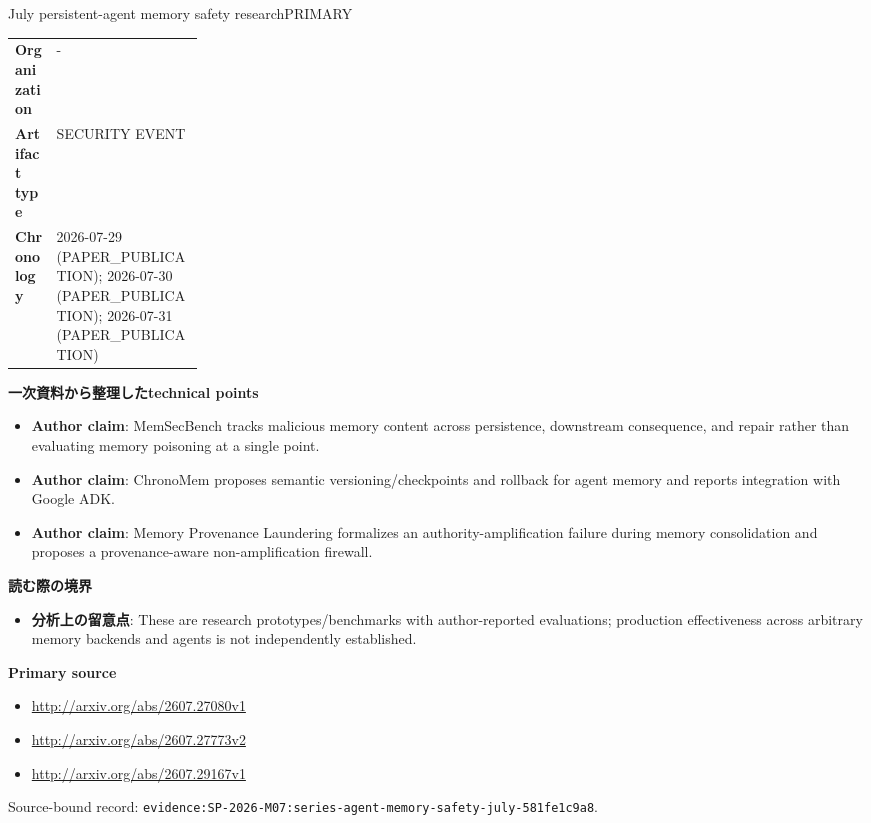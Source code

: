\begin{technicalnote}{July persistent-agent memory safety research}{PRIMARY}
\begin{tabularx}{\linewidth}{@{}>{\bfseries}p{0.22\linewidth}X@{}}
Organization & - \\
Artifact type & SECURITY EVENT \\
Chronology & 2026-07-29 (PAPER\_PUBLICATION); 2026-07-30 (PAPER\_PUBLICATION); 2026-07-31 (PAPER\_PUBLICATION) \\
\end{tabularx}
\smallskip
{\bfseries 一次資料から整理したtechnical points}
\begin{itemize}[leftmargin=1.5em,itemsep=0.35em]
\item \textbf{Author claim}: MemSecBench tracks malicious memory content across persistence, downstream consequence, and repair rather than evaluating memory poisoning at a single point.
\item \textbf{Author claim}: ChronoMem proposes semantic versioning/checkpoints and rollback for agent memory and reports integration with Google ADK.
\item \textbf{Author claim}: Memory Provenance Laundering formalizes an authority-amplification failure during memory consolidation and proposes a provenance-aware non-amplification firewall.
\end{itemize}
{\bfseries 読む際の境界}
\begin{itemize}[leftmargin=1.5em,itemsep=0.35em]
\item \textbf{分析上の留意点}: These are research prototypes/benchmarks with author-reported evaluations; production effectiveness across arbitrary memory backends and agents is not independently established.
\end{itemize}
{\bfseries Primary source}
\begingroup\sloppy
\begin{itemize}[leftmargin=1.5em,itemsep=0.25em]
\item {\scriptsize\url{http://arxiv.org/abs/2607.27080v1}}
\item {\scriptsize\url{http://arxiv.org/abs/2607.27773v2}}
\item {\scriptsize\url{http://arxiv.org/abs/2607.29167v1}}
\end{itemize}
\endgroup
{\scriptsize\color{SurveyMuted}Source-bound record: \texttt{evidence:SP-2026-M07:series-agent-memory-safety-july-581fe1c9a8}.}
\end{technicalnote}
\medskip
